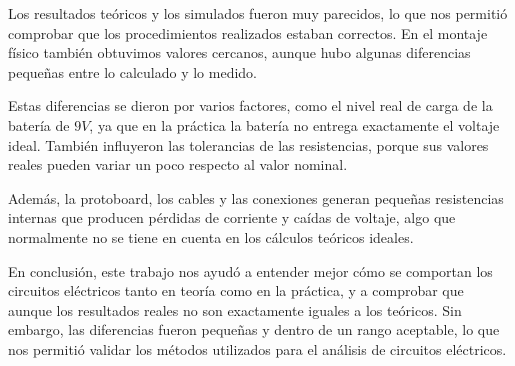 \documentclass[conference]{IEEEtran}
\begin{document}
Los resultados teóricos y los simulados fueron muy parecidos, lo que nos permitió comprobar que los
procedimientos realizados estaban correctos. En el montaje físico también obtuvimos valores cercanos,
aunque hubo algunas diferencias pequeñas entre lo calculado y lo medido.

Estas diferencias se dieron por varios factores, como el nivel real de carga de la batería de $9V$,
ya que en la práctica la batería no entrega exactamente el voltaje ideal. También influyeron las
tolerancias de las resistencias, porque sus valores reales pueden variar un poco respecto al valor nominal.

Además, la protoboard, los cables y las conexiones generan pequeñas resistencias internas que
producen pérdidas de corriente y caídas de voltaje, algo que normalmente no se tiene en cuenta en
los cálculos teóricos ideales.

En conclusión, este trabajo nos ayudó a entender mejor cómo se comportan los circuitos eléctricos
tanto en teoría como en la práctica, y a comprobar que aunque los resultados reales no son exactamente
iguales a los teóricos. Sin embargo, las diferencias fueron pequeñas y dentro de un rango aceptable,
lo que nos permitió validar los métodos utilizados para el análisis de circuitos eléctricos.
\end{document}
